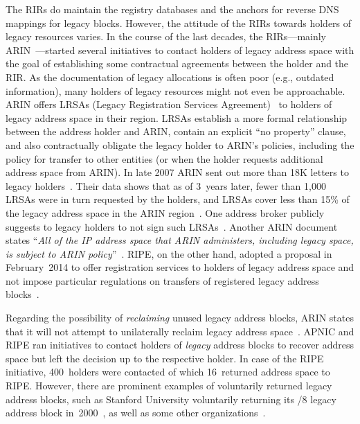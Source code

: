 \documentclass[letter]{sigcomm-alternate}
\begin{document}
The RIRs do maintain the registry databases and the anchors for reverse DNS
mappings for legacy blocks. However, the attitude of the RIRs towards holders
of legacy resources varies.  In the course of the last decades, the
RIRs---mainly ARIN~\cite{arin_reclaim}---started several initiatives to contact
holders of legacy address space with the goal of establishing some contractual
agreements between the holder and the RIR. As the documentation of legacy
allocations is often poor (e.g., outdated information), many holders of legacy
resources might not even be approachable. ARIN offers LRSAs (Legacy
Registration Services Agreement)~\cite{arin_lrsa} to holders of
legacy address space in their region. LRSAs establish a more formal
relationship between the address holder and ARIN, contain an explicit ``no
property'' clause, and  also contractually obligate the legacy holder
to ARIN's policies, including the policy for transfer to other entities (or when
the holder requests additional address space from ARIN).  In late 2007 ARIN
sent out more than 18K letters to legacy holders~\cite{arin_reclaim}.  Their
data shows that as of 3~years later, fewer than 1,000 LRSAs were in turn
requested by the holders,
and LRSAs cover less than 15\% of the legacy address space in 
the ARIN region~\cite{arin_lrsa_coverage}.
One address broker publicly suggests to legacy holders to not sign such 
LRSAs~\cite{donotsignrsa}. Another ARIN document states ``\textit{All 
of the IP address space that ARIN administers, including legacy space, is 
subject to ARIN policy}''~\cite{arin_transfer_legacy}. RIPE, on the other hand, 
adopted a proposal in February~2014 to offer registration services to holders 
of legacy address space and not impose particular regulations on transfers of 
registered legacy address blocks~\cite{ripe_legacy}.

Regarding the possibility of \textit{reclaiming} unused legacy address
blocks, ARIN states that it will not attempt to unilaterally reclaim
legacy address space~\cite{arin_lrsa_info}.  APNIC and RIPE ran
initiatives to contact holders of \textit{legacy} address blocks to recover 
address space \cite{ripe_reclaim, apnic_reclaim} but left
the decision up to the respective holder. In case of the RIPE
initiative, 400~holders were contacted of which 16~returned address
space to RIPE. However, there are prominent examples of voluntarily returned
legacy address blocks, such as Stanford University voluntarily
returning its /8 legacy address block in~2000~\cite{recovery_stanford}, as well 
as some other organizations~\cite{icann_recovery}.
\end{document}
